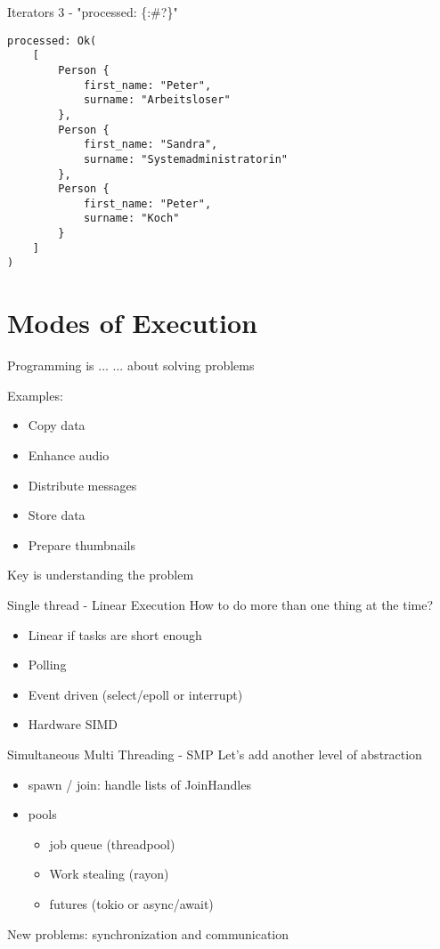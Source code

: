 \documentclass[aspectratio=1610,t]{beamer}
\begin{document}
\begin{frame}[fragile]{Iterators 3 - "processed: \{:\#?\}"}
\begin{verbatim}
processed: Ok(
    [
        Person {
            first_name: "Peter",
            surname: "Arbeitsloser"
        },
        Person {
            first_name: "Sandra",
            surname: "Systemadministratorin"
        },
        Person {
            first_name: "Peter",
            surname: "Koch"
        }
    ]
)
\end{verbatim}
\end{frame}



{
\section{Modes of Execution}
}

\begin{frame}[fragile]{Programming is ...}
... about solving problems

Examples:
\begin{itemize}
  \item Copy data
  \item Enhance audio
  \item Distribute messages
  \item Store data
  \item Prepare thumbnails
\end{itemize}

Key is understanding the problem
\end{frame}

\begin{frame}[fragile]{Single thread - Linear Execution}
How to do more than one thing at the time?

\begin{itemize}
  \item Linear if tasks are short enough
  \item Polling
  \item Event driven (select/epoll or interrupt)
  \item Hardware SIMD
\end{itemize}
\end{frame}

\begin{frame}[fragile]{Simultaneous Multi Threading - SMP}
Let's add another level of abstraction
\begin{itemize}
  \item spawn / join: handle lists of JoinHandles
  \item pools \begin{itemize}
      \item job queue (threadpool)
      \item Work stealing (rayon)
      \item futures (tokio or async/await)
    \end{itemize}
\end{itemize}

New problems: synchronization and communication

\end{frame}
\end{document}
